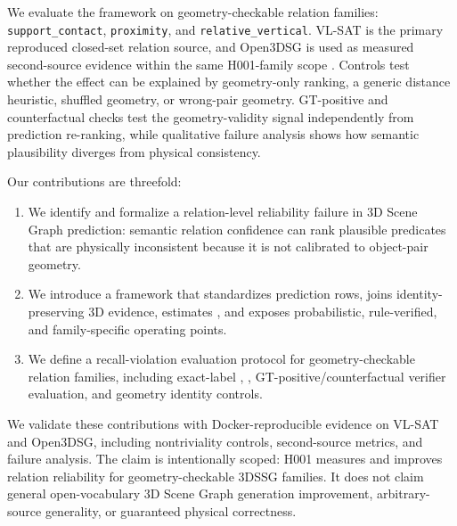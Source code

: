 We evaluate the framework on geometry-checkable relation families:
\texttt{support\_contact}, \texttt{proximity}, and
\texttt{relative\_vertical}. VL-SAT is the primary reproduced closed-set
relation source, and Open3DSG is used as measured second-source evidence within
the same H001-family scope \cite{wang2023vlsat,koch2024open3dsg}. Controls test
whether the effect can be explained by geometry-only ranking, a generic
distance heuristic, shuffled geometry, or wrong-pair geometry. GT-positive and
counterfactual checks test the geometry-validity signal independently from
prediction re-ranking, while qualitative failure analysis shows how semantic
plausibility diverges from physical consistency.

Our contributions are threefold:
\begin{enumerate}
    \item We identify and formalize a relation-level reliability failure in 3D
    Scene Graph prediction: semantic relation confidence can rank plausible
    predicates that are physically inconsistent because it is not calibrated to
    object-pair geometry.
    \item We introduce a \method{} framework that standardizes prediction rows,
    joins identity-preserving 3D evidence, estimates \pgeom{}, and exposes
    probabilistic, rule-verified, and family-specific operating points.
    \item We define a recall-violation evaluation protocol for
    geometry-checkable relation families, including exact-label ,
    , GT-positive/counterfactual verifier evaluation, and geometry
    identity controls.
\end{enumerate}

We validate these contributions with Docker-reproducible evidence on VL-SAT and
Open3DSG, including nontriviality controls, second-source metrics, and failure
analysis. The claim is intentionally scoped: H001 measures and improves
relation reliability for geometry-checkable 3DSSG families. It does not claim
general open-vocabulary 3D Scene Graph generation improvement,
arbitrary-source generality, or guaranteed physical correctness.

